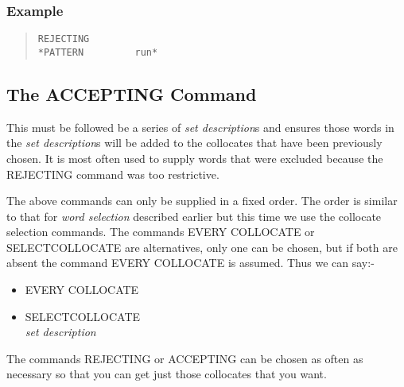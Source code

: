 \subsubsection{Example}
\begin{quote}
\begin{verbatim}
REJECTING
*PATTERN         run*
\end{verbatim}
\end{quote}

\subsection{The ACCEPTING Command}
This must be followed be a series of {\em set description}s and ensures
those words in the {\em set description}s will be added to
the collocates that have been previously chosen.
It is most often used to supply words
that were excluded because the REJECTING command was too restrictive.

The above commands can only be supplied in a fixed order. The order is
similar to that for {\em word selection} described earlier but this time we
use the collocate selection commands. The commands EVERY COLLOCATE or
SELECTCOLLOCATE are alternatives, only one can be chosen, but if both
are absent the command EVERY COLLOCATE is assumed. Thus we can say:-
\begin{itemize}
\item  EVERY COLLOCATE
\item  SELECTCOLLOCATE\\
       {\em set description}
\end{itemize}
The commands REJECTING or ACCEPTING can be chosen as often as necessary
so that you can get just those collocates that you want.

